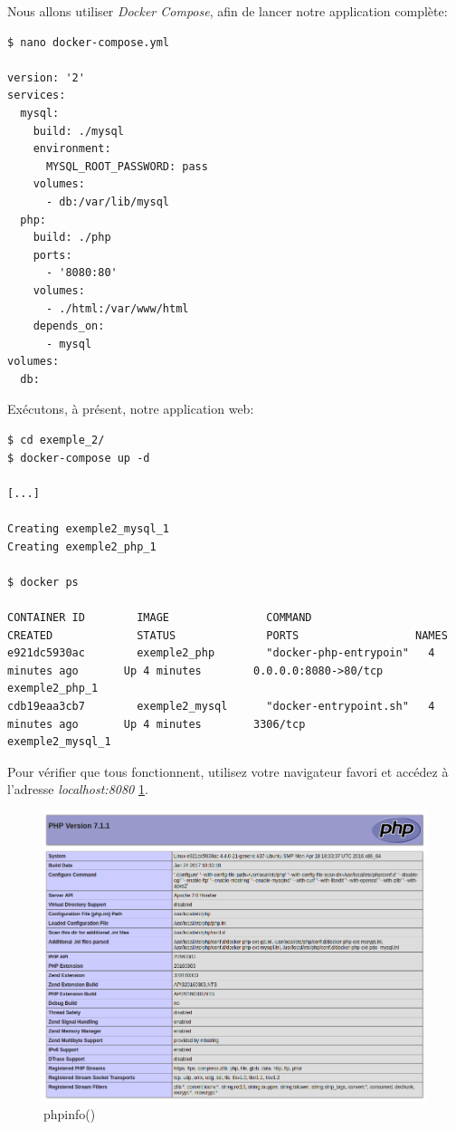 Nous allons utiliser \emph{Docker Compose}, afin de lancer notre application complète:

\begin{lstlisting}[frame=single]
$ nano docker-compose.yml

version: '2'
services:
  mysql:
    build: ./mysql
    environment:
      MYSQL_ROOT_PASSWORD: pass
    volumes:
      - db:/var/lib/mysql
  php:
    build: ./php
    ports:
      - '8080:80'
    volumes:
      - ./html:/var/www/html
    depends_on:
      - mysql
volumes:
  db:

\end{lstlisting}

Exécutons, à présent, notre application web:

\begin{lstlisting}[frame=single]
$ cd exemple_2/
$ docker-compose up -d

[...]

Creating exemple2_mysql_1
Creating exemple2_php_1

$ docker ps

CONTAINER ID        IMAGE               COMMAND                  CREATED             STATUS              PORTS                  NAMES
e921dc5930ac        exemple2_php        "docker-php-entrypoin"   4 minutes ago       Up 4 minutes        0.0.0.0:8080->80/tcp   exemple2_php_1
cdb19eaa3cb7        exemple2_mysql      "docker-entrypoint.sh"   4 minutes ago       Up 4 minutes        3306/tcp               exemple2_mysql_1

\end{lstlisting}

Pour vérifier que tous fonctionnent, utilisez votre navigateur favori et accédez à l'adresse \emph{localhost:8080} \ref{fig:phpinfo}.

\begin{figure}[H] 
\centering 
\includegraphics[width=1\columnwidth]{img/phpinfo} 
\caption[phpinfo]{phpinfo()}
\label{fig:phpinfo} 
\end{figure}

